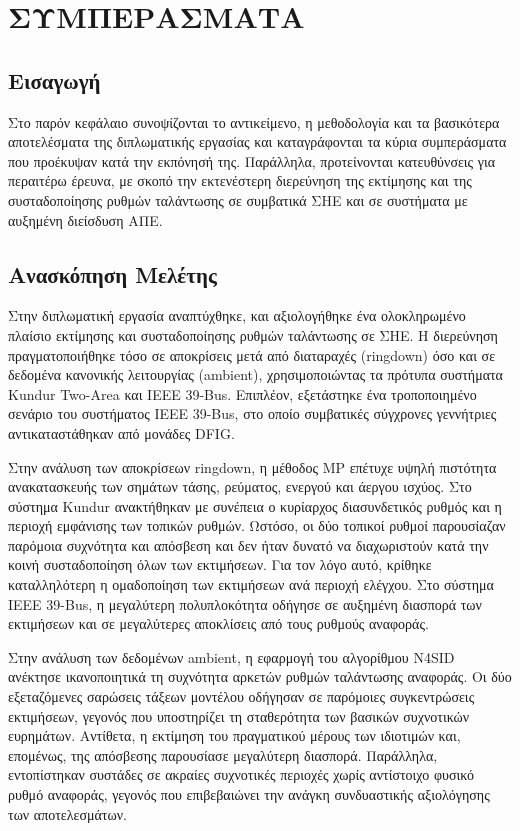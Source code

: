\chapter{ΣΥΜΠΕΡΑΣΜΑΤΑ}

\section{Εισαγωγή}

Στο παρόν κεφάλαιο συνοψίζονται το αντικείμενο, η μεθοδολογία και τα
βασικότερα αποτελέσματα της διπλωματικής εργασίας και καταγράφονται τα
κύρια συμπεράσματα που προέκυψαν κατά την εκπόνησή της. Παράλληλα,
προτείνονται κατευθύνσεις για περαιτέρω έρευνα, με σκοπό την εκτενέστερη
διερεύνηση της εκτίμησης και της συσταδοποίησης ρυθμών
ταλάντωσης σε συμβατικά ΣHE και σε συστήματα με
αυξημένη διείσδυση ΑΠΕ.

\section{Ανασκόπηση Μελέτης}

Στην διπλωματική εργασία αναπτύχθηκε, και αξιολογήθηκε ένα ολοκληρωμένο πλαίσιο εκτίμησης και συσταδοποίησης ρυθμών ταλάντωσης σε ΣΗΕ. Η διερεύνηση πραγματοποιήθηκε τόσο σε αποκρίσεις μετά από διαταραχές (\textenglish{ringdown}) όσο και σε δεδομένα κανονικής λειτουργίας (\textenglish{ambient}), χρησιμοποιώντας τα πρότυπα συστήματα \textenglish{Kundur Two-Area} και \textenglish{IEEE 39-Bus}. Επιπλέον, εξετάστηκε ένα τροποποιημένο σενάριο του συστήματος \textenglish{IEEE 39-Bus}, στο οποίο συμβατικές σύγχρονες γεννήτριες αντικαταστάθηκαν από μονάδες \textenglish{DFIG}.

Στην ανάλυση των αποκρίσεων \textenglish{ringdown}, η μέθοδος \textenglish{MP} επέτυχε υψηλή πιστότητα ανακατασκευής των σημάτων τάσης, ρεύματος, ενεργού και άεργου ισχύος. Στο σύστημα \textenglish{Kundur} ανακτήθηκαν με συνέπεια ο κυρίαρχος διασυνδετικός ρυθμός και η περιοχή εμφάνισης των τοπικών ρυθμών. Ωστόσο, οι δύο τοπικοί ρυθμοί παρουσίαζαν παρόμοια συχνότητα και απόσβεση και δεν ήταν δυνατό να διαχωριστούν κατά την κοινή συσταδοποίηση όλων των εκτιμήσεων. Για τον λόγο αυτό, κρίθηκε καταλληλότερη η ομαδοποίηση των εκτιμήσεων ανά περιοχή ελέγχου. Στο σύστημα \textenglish{IEEE 39-Bus}, η μεγαλύτερη πολυπλοκότητα οδήγησε σε αυξημένη διασπορά των εκτιμήσεων και σε μεγαλύτερες αποκλίσεις από τους ρυθμούς αναφοράς.

Στην ανάλυση των δεδομένων \textenglish{ambient}, η εφαρμογή του αλγορίθμου \textenglish{N4SID} ανέκτησε ικανοποιητικά τη συχνότητα αρκετών ρυθμών ταλάντωσης αναφοράς. Οι δύο εξεταζόμενες σαρώσεις τάξεων μοντέλου οδήγησαν σε παρόμοιες συγκεντρώσεις εκτιμήσεων, γεγονός που υποστηρίζει τη σταθερότητα των βασικών συχνοτικών ευρημάτων. Αντίθετα, η εκτίμηση του πραγματικού μέρους των ιδιοτιμών και, επομένως, της απόσβεσης παρουσίασε μεγαλύτερη διασπορά. Παράλληλα, εντοπίστηκαν συστάδες σε ακραίες συχνοτικές περιοχές χωρίς αντίστοιχο φυσικό ρυθμό αναφοράς, γεγονός που επιβεβαιώνει την ανάγκη συνδυαστικής αξιολόγησης των αποτελεσμάτων.

